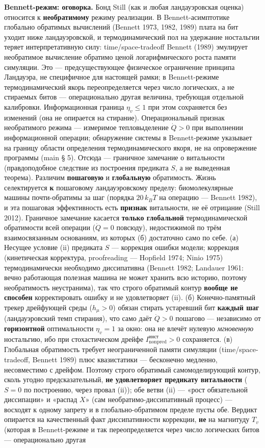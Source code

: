 \documentclass[pdflatex,sn-mathphys-ay]{sn-jnl}
\begin{document}
\textbf{Bennett-режим: оговорка.} Бонд Still (как и любая ландауэровская оценка) относится к \textbf{необратимому} режиму реализации. В Bennett-асимптотике глобально обратимых вычислений (Bennett 1973, 1982, 1989) плата на бит уходит ниже ландауэровской, и термодинамический пол на удержание ностальгии теряет интерпретативную силу: time/space-tradeoff Bennett (1989) эмулирует необратимое вычисление обратимо ценой логарифмического роста памяти симуляции. Это --- предсуществующее физическое ограничение принципа Ландауэра, не специфичное для настоящей рамки; в Bennett-режиме термодинамический якорь переопределяется через число логических, а не стираемых битов --- операционально другая величина, требующая отдельной калибровки. Информационная граница \(\eta_v \le 1\) при этом сохраняется без изменений (она не опирается на стирание). Операциональный признак необратимого режима --- измеримое тепловыделение \(\dot Q > 0\) при выполнении информационной операции; обнаружение системы в Bennett-режиме указывает на границу области определения термодинамического якоря, не на опровержение программы (main § 5). Отсюда --- граничное замечание о витальности (правдоподобное следствие из построения предиката \(S\), а не выведенная теорема). Различим \textbf{пошаговую} и \textbf{глобальную} обратимость. Жизнь селектируется \textbf{к} пошаговому ландауэровскому пределу: биомолекулярные машины почти-обратимы за шаг (порядка \(20\,k_B T\) на операцию --- Bennett 1982), и эта пошаговая эффективность есть \textbf{признак} витальности, не её отрицание (Still 2012). Граничное замечание касается \textbf{только глобальной} термодинамической обратимости всей операции (\(\dot Q = 0\) повсюду), недостижимой по трём взаимосвязанным основаниям, из которых (б) достаточно само по себе. (а) Несущее условие (ii) предиката \(S\) --- коррекция ошибки модели; коррекция (кинетическая корректура, proofreading --- Hopfield 1974; Ninio 1975) термодинамически необходимо диссипативна (Bennett 1982; Landauer 1961: вечно работающая полезная машина не может хранить всю историю, поэтому необратимость неустранима), так что строго обратимый контур \textbf{вообще не способен} корректировать ошибку и не удовлетворяет (ii). (б) Конечно-памятный трекер дрейфующей среды (\(h_\mu > 0\)) обязан стирать устаревший бит \textbf{каждый шаг} (ландауэровский темп стирания), что само даёт \(\dot Q > 0\) пошагово --- независимо от \textbf{горизонтной} оптимальности \(\eta_v = 1\) за окно: она не влечёт нулевую \emph{мгновенную} ностальгию, ибо при стохастическом дрейфе \(I_{\text{nonpred}}^{\text{инст}} > 0\) сохраняется. (в) Глобальная обратимость требует неограниченной памяти симуляции (time/space-tradeoff, Bennett 1989) плюс квазистатики --- бесконечно медленно, несовместимо с дрейфом. Поэтому строго обратимый самомоделирующий контур, сколь угодно предсказательный, \textbf{не удовлетворяет предикату витальности} (\(S = 0\) по построению, через провал (ii)); обе ветви (ii) --- «рост обязательной диссипации» и «распад \(X\)» (сам необратимо-диссипативный процесс) --- восходят к одному запрету и в глобально-обратимом пределе пусты обе. Вердикт опирается на качественный факт диссипативности коррекции, \textbf{не} на магнитуду \(T_v\) (которая в Bennett-режиме и так переопределяется через число логических битов --- операционально другая 
\end{document}

